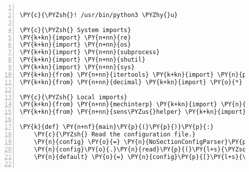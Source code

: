 \begin{Verbatim}[commandchars=\\\{\},fontsize=\small,numbers=left,firstnumber=1,stepnumber=2,firstline=2]

\PY{c}{\PYZsh{}! /usr/bin/python3 \PYZhy{}u}

\PY{c}{\PYZsh{} System imports}
\PY{k+kn}{import} \PY{n+nn}{re}
\PY{k+kn}{import} \PY{n+nn}{os}
\PY{k+kn}{import} \PY{n+nn}{subprocess}
\PY{k+kn}{import} \PY{n+nn}{shutil}
\PY{k+kn}{import} \PY{n+nn}{sys}
\PY{k+kn}{from} \PY{n+nn}{itertools} \PY{k+kn}{import} \PY{n}{product}
\PY{k+kn}{from} \PY{n+nn}{decimal} \PY{k+kn}{import} \PY{o}{*}

\PY{c}{\PYZsh{} Local imports}
\PY{k+kn}{from} \PY{n+nn}{mechinterp} \PY{k+kn}{import} \PY{n}{mechinterp}
\PY{k+kn}{from} \PY{n+nn}{sens\PYZus{}helper} \PY{k+kn}{import} \PY{o}{*}

\PY{k}{def} \PY{n+nf}{main}\PY{p}{(}\PY{p}{)}\PY{p}{:}
    \PY{c}{\PYZsh{} Read the configuration file.}
    \PY{n}{config} \PY{o}{=} \PY{n}{NoSectionConfigParser}\PY{p}{(}\PY{p}{)}
    \PY{n}{config}\PY{o}{.}\PY{n}{read}\PY{p}{(}\PY{l+s}{\PYZsq{}}\PY{l+s}{pysens.conf}\PY{l+s}{\PYZsq{}}\PY{p}{)}
    \PY{n}{default} \PY{o}{=} \PY{n}{config}\PY{p}{[}\PY{l+s}{\PYZsq{}}\PY{l+s}{DEFAULT}\PY{l+s}{\PYZsq{}}\PY{p}{]}


\end{Verbatim}
